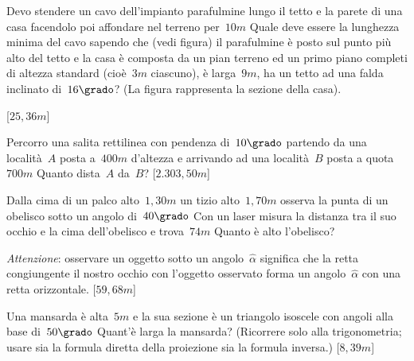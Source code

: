 \begin{multicols}{2}

\begin{esercizio}[\Ast]
\label{ese:G.47}
Devo stendere un cavo dell'impianto parafulmine lungo il tetto e la parete di 
una casa facendolo poi affondare nel terreno per~$10\unit{m}$
Quale deve essere la lunghezza minima del cavo sapendo che (vedi figura) il 
parafulmine è posto sul punto più alto del tetto e la casa è
composta da un pian terreno ed un primo piano completi di altezza standard 
(cioè~$3\unit{m}$ ciascuno), è larga~$9\unit{m}$,
ha un tetto ad una falda inclinato di~$16\grado$? (La figura rappresenta la 
sezione della casa).
\begin{center}
\begin{inaccessibleblock}
 
\end{inaccessibleblock}
\end{center}
\hfill [$25,36\unit{m}$]
\end{esercizio}


 \begin{esercizio}[\Ast]
\label{ese:G.48}
Percorro una salita rettilinea con pendenza di~$10\grado$ partendo da una 
località~$A$ posta a~$400\unit{m}$ d'altezza e arrivando ad
una località~$B$ posta a quota~$700\unit{m}$ Quanto dista~$A$ da~$B$?
\hfill [$2.303,50\unit{m}$]
\end{esercizio}

\begin{esercizio}[\Ast]
\label{ese:G.49}
Dalla cima di un palco alto~$1,30\unit{m}$ un tizio alto~$1,70\unit{m}$ osserva 
la punta di un obelisco sotto un angolo di~$40\grado$
Con un laser misura la distanza tra il suo occhio e la cima dell'obelisco e 
trova~$74\unit{m}$ Quanto è alto l'obelisco?

\emph{Attenzione}: osservare un oggetto sotto un angolo~$\hat{\alpha}$ significa 
che la retta congiungente il nostro occhio con l'oggetto osservato
forma un angolo~$\hat{\alpha}$ con una retta orizzontale.
\hfill [${59,68\unit{m}}$]
\end{esercizio}

\begin{esercizio}[\Ast]
\label{ese:G.50}
Una mansarda è alta~$5\unit{m}$ e la sua sezione è un triangolo isoscele con 
angoli alla base di~$50\grado$ Quant'è larga la mansarda?
(Ricorrere solo alla trigonometria; usare sia la formula diretta della 
proiezione sia la formula inversa.)
\hfill [$8,39\unit{m}$]
\end{esercizio}
\end{multicols}

